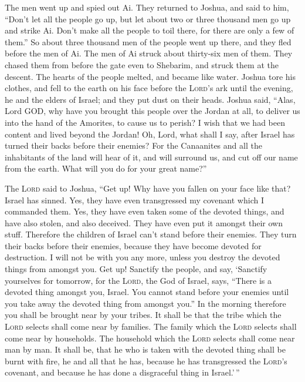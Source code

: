 The men went up and spied out Ai.  They returned to
Joshua, and said to him, ``Don't let all the people go up, but let about
two or three thousand men go up and strike Ai. Don't make all the people
to toil there, for there are only a few of them.''  So
about three thousand men of the people went up there, and they fled
before the men of Ai.  The men of Ai struck about
thirty-six men of them. They chased them from before the gate even to
Shebarim, and struck them at the descent. The hearts of the people
melted, and became like water.  Joshua tore his clothes,
and fell to the earth on his face before the \textsc{Lord}'s ark until
the evening, he and the elders of Israel; and they put dust on their
heads.  Joshua said, ``Alas, Lord GOD, why have you
brought this people over the Jordan at all, to deliver us into the hand
of the Amorites, to cause us to perish? I wish that we had been content
and lived beyond the Jordan!  Oh, Lord, what shall I say,
after Israel has turned their backs before their enemies? 
For the Canaanites and all the inhabitants of the land will hear of it,
and will surround us, and cut off our name from the earth. What will you
do for your great name?''

 The \textsc{Lord} said to Joshua, ``Get up! Why have you
fallen on your face like that?  Israel has sinned. Yes,
they have even transgressed my covenant which I commanded them. Yes,
they have even taken some of the devoted things, and have also stolen,
and also deceived. They have even put it amongst their own stuff.
 Therefore the children of Israel can't stand before
their enemies. They turn their backs before their enemies, because they
have become devoted for destruction. I will not be with you any more,
unless you destroy the devoted things from amongst you. 
Get up! Sanctify the people, and say, `Sanctify yourselves for tomorrow,
for the \textsc{Lord}, the God of Israel, says, ``There is a devoted
thing amongst you, Israel. You cannot stand before your enemies until
you take away the devoted thing from amongst you.''  In
the morning therefore you shall be brought near by your tribes. It shall
be that the tribe which the \textsc{Lord} selects shall come near by
families. The family which the \textsc{Lord} selects shall come near by
households. The household which the \textsc{Lord} selects shall come
near man by man.  It shall be, that he who is taken with
the devoted thing shall be burnt with fire, he and all that he has,
because he has transgressed the \textsc{Lord}'s covenant, and because he
has done a disgraceful thing in Israel.'\,''

